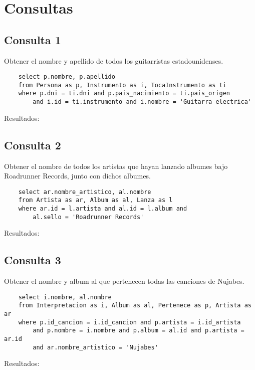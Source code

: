 \documentclass[10pt,a4paper]{article}
\begin{document}
\newpage

\section{Consultas}

\subsection{Consulta 1}
Obtener el nombre y apellido de todos los guitarristas estadounidenses.

\begin{lstlisting}
	select p.nombre, p.apellido
	from Persona as p, Instrumento as i, TocaInstrumento as ti
	where p.dni = ti.dni and p.pais_nacimiento = ti.pais_origen
		and i.id = ti.instrumento and i.nombre = 'Guitarra electrica'
\end{lstlisting}

Resultados:

\subsection{Consulta 2}
Obtener el nombre de todos los artistas que hayan lanzado albumes bajo Roadrunner Records, junto con dichos albumes.

\begin{lstlisting}
	select ar.nombre_artistico, al.nombre
	from Artista as ar, Album as al, Lanza as l
	where ar.id = l.artista and al.id = l.album and
		al.sello = 'Roadrunner Records'
\end{lstlisting}

Resultados:

\subsection{Consulta 3}
Obtener el nombre y album al que pertenecen todas las canciones de Nujabes.

\begin{lstlisting}
	select i.nombre, al.nombre
	from Interpretacion as i, Album as al, Pertenece as p, Artista as ar
	where p.id_cancion = i.id_cancion and p.artista = i.id_artista
		and p.nombre = i.nombre and p.album = al.id and p.artista = ar.id
		and ar.nombre_artistico = 'Nujabes'
\end{lstlisting}

Resultados:


\end{document}
